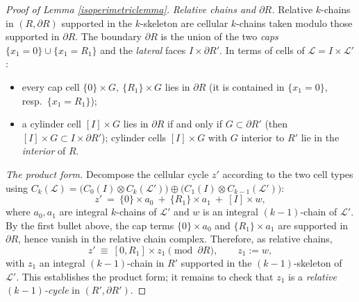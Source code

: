 \documentclass{amsart}
\newtheorem*{theorem 1}{Theorem 1}
\newtheorem*{theorem 2}{Theorem 2}
\newtheorem*{theorem 3}{Theorem 3}
\numberwithin{equation}{section}
\begin{document}
\begin{proof} [Proof of Lemma \ref{isoperimetriclemma}]
\medskip
\noindent\emph{Relative chains and $\partial R$.}
Relative $k$-chains in $(R,\partial R)$ supported in the
$k$-skeleton are cellular $k$-chains taken modulo those supported
in $\partial R$.  The boundary $\partial R$ is the union of the two
\emph{caps} $\{x_1=0\}\cup\{x_1=R_1\}$ and the \emph{lateral}
faces $I\times\partial R'$.  In terms of cells of
$\mathcal{L} = I\times\mathcal{L}'$:
\begin{itemize}
\item every cap cell $\{0\}\times G,\ \{R_1\}\times G$ lies in
  $\partial R$ (it is contained in $\{x_1=0\}$, resp.\
  $\{x_1=R_1\}$);
\item a cylinder cell $[I]\times G$ lies in $\partial R$ if and
  only if $G\subset\partial R'$ (then $[I]\times G\subset
  I\times\partial R'$); cylinder cells $[I]\times G$ with $G$
  interior to $R'$ lie in the \emph{interior} of $R$.
\end{itemize}

\medskip
\noindent\emph{The product form.}
Decompose the cellular cycle $z'$ according to the two cell types
using $C_k(\mathcal L)=\big(C_0(I)\otimes C_k(\mathcal L')\big)
\oplus\big(C_1(I)\otimes C_{k-1}(\mathcal L')\big)$:
\begin{equation} \label{decomp}
 z' \ =\ \{0\}\times a_0 \ +\ \{R_1\}\times a_1 \ +\ [I]\times w,
\end{equation}
where $a_0,a_1$ are integral $k$-chains of $\mathcal{L}'$ and $w$
is an integral $(k-1)$-chain of $\mathcal{L}'$.  By the first bullet
above, the cap terms $\{0\}\times a_0$ and $\{R_1\}\times a_1$ are
supported in $\partial R$, hence vanish in the relative chain
complex.  Therefore, as relative chains,
\begin{equation} \label{prodform}
 z' \ \equiv\ [0,R_1]\times z_1 \pmod{\partial R},
 \qquad z_1 := w,
\end{equation}
with $z_1$ an integral $(k-1)$-chain in $R'$ supported in the
$(k-1)$-skeleton of $\mathcal{L}'$.  This establishes the product
form; it remains to check that $z_1$ is a \emph{relative
$(k-1)$-cycle} in $(R',\partial R')$.


\end{proof}
\end{document}
